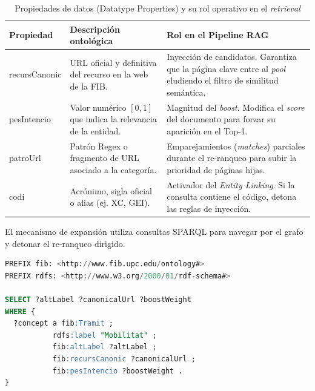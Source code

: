 \begin{table}[H]
\centering
\caption{Propiedades de datos (Datatype Properties) y su rol operativo en el \textit{retrieval}}
\label{tab:datatype_properties}
\renewcommand{\arraystretch}{1.4}
\begin{tabularx}{\textwidth}{>{\ttfamily}lXX}
\toprule
\textbf{\textnormal{Propiedad}} & \textbf{Descripción ontológica} & \textbf{Rol en el Pipeline RAG} \\
\midrule
recursCanonic & URL oficial y definitiva del recurso en la web de la FIB. & Inyección de candidatos. Garantiza que la página clave entre al \textit{pool} eludiendo el filtro de similitud semántica. \\
pesIntencio & Valor numérico $[0, 1]$ que indica la relevancia de la entidad. & Magnitud del \textit{boost}. Modifica el \textit{score} del documento para forzar su aparición en el Top-1. \\
patroUrl & Patrón Regex o fragmento de URL asociado a la categoría. & Emparejamientos (\textit{matches}) parciales durante el re-ranqueo para subir la prioridad de páginas hijas. \\
codi & Acrónimo, sigla oficial o alias (ej. XC, GEI). & Activador del \textit{Entity Linking}. Si la consulta contiene el código, detona las reglas de inyección. \\
\bottomrule
\end{tabularx}
\end{table}

El mecanismo de expansión utiliza consultas SPARQL para navegar por el grafo y detonar el re-ranqueo dirigido.

\begin{lstlisting}[language=SQL, caption={Consulta SPARQL para recuperar atributos de inyección}, label={lst:sparql_expansion}]
PREFIX fib: <http://www.fib.upc.edu/ontology#>
PREFIX rdfs: <http://www.w3.org/2000/01/rdf-schema#>

SELECT ?altLabel ?canonicalUrl ?boostWeight
WHERE {
  ?concept a fib:Tramit ;
           rdfs:label "Mobilitat" ;
           fib:altLabel ?altLabel ;
           fib:recursCanonic ?canonicalUrl ;
           fib:pesIntencio ?boostWeight .
}
\end{lstlisting}

